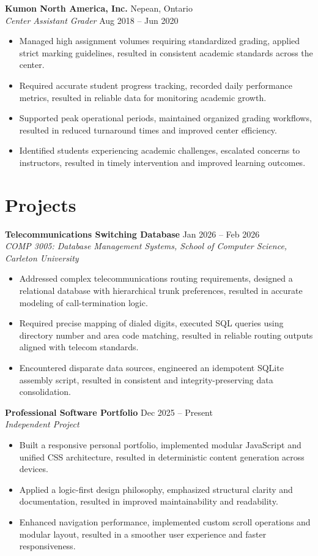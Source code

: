 \documentclass[12pt,letterpaper]{article}
\begin{document}
	\vspace{5pt}
	\noindent
	\textbf{Kumon North America, Inc.} \hfill Nepean, Ontario \\
	\textsl{Center Assistant Grader} \hfill Aug 2018 -- Jun 2020
	\begin{itemize}
		\item Managed high assignment volumes requiring standardized grading, applied strict marking guidelines, resulted in consistent academic standards across the center.
		\item Required accurate student progress tracking, recorded daily performance metrics, resulted in reliable data for monitoring academic growth.
		\item Supported peak operational periods, maintained organized grading workflows, resulted in reduced turnaround times and improved center efficiency.
		\item Identified students experiencing academic challenges, escalated concerns to instructors, resulted in timely intervention and improved learning outcomes.
	\end{itemize}
	
	\section{Projects}
	\noindent
	\textbf{Telecommunications Switching Database} \hfill Jan 2026 -- Feb 2026 \\
	\textit{COMP 3005: Database Management Systems, School of Computer Science, Carleton University}
	\begin{itemize}
		\item Addressed complex telecommunications routing requirements, designed a relational database with hierarchical trunk preferences, resulted in accurate modeling of call-termination logic.
		\item Required precise mapping of dialed digits, executed SQL queries using directory number and area code matching, resulted in reliable routing outputs aligned with telecom standards.
		\item Encountered disparate data sources, engineered an idempotent SQLite assembly script, resulted in consistent and integrity-preserving data consolidation.
	\end{itemize}
	
	\vspace{5pt}
	\noindent
	\textbf{Professional Software Portfolio} \hfill Dec 2025 -- Present \\
	\textit{Independent Project}
	\begin{itemize}
		\item Built a responsive personal portfolio, implemented modular JavaScript and unified CSS architecture, resulted in deterministic content generation across devices.
		\item Applied a logic-first design philosophy, emphasized structural clarity and documentation, resulted in improved maintainability and readability.
		\item Enhanced navigation performance, implemented custom scroll operations and modular layout, resulted in a smoother user experience and faster responsiveness.
	\end{itemize}
	
\end{document}
